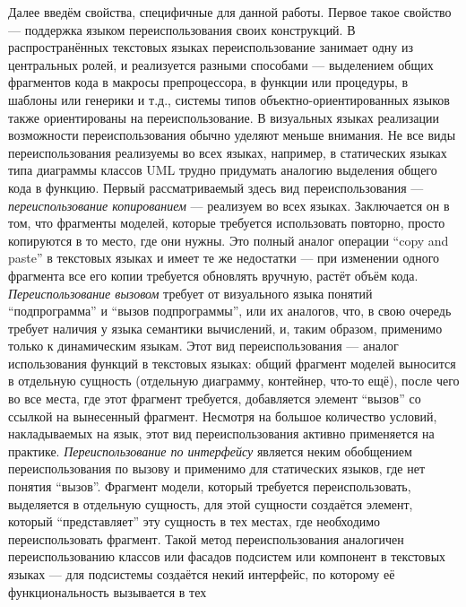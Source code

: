 Далее введём свойства, специфичные для данной работы. Первое такое свойство 
--- поддержка языком переиспользования своих конструкций. В распространённых 
текстовых языках переиспользование занимает одну из центральных ролей, и 
реализуется разными способами --- выделением общих фрагментов кода в макросы 
препроцессора, в функции или процедуры, в шаблоны или генерики и т.д., 
системы типов объектно-ориентированных языков также ориентированы на 
переиспользование. В визуальных языках реализации возможности переиспользования 
обычно уделяют меньше внимания. Не все виды переиспользования реализуемы во всех 
языках, например, в статических языках типа диаграммы классов UML трудно 
придумать аналогию выделения общего кода в функцию. Первый рассматриваемый 
здесь вид переиспользования --- \textit{переиспользование копированием} 
--- реализуем 
во всех языках. Заключается он в том, что фрагменты моделей, которые требуется 
использовать повторно, просто копируются в то место, где они нужны. Это полный 
аналог операции "`copy and paste"' в текстовых языках и имеет те же недостатки 
--- при изменении одного фрагмента все его копии требуется обновлять вручную, 
растёт объём кода. \textit{Переиспользование вызовом} требует от визуального языка 
понятий "`подпрограмма"' и "`вызов подпрограммы"', или их аналогов, что, в свою 
очередь требует наличия у языка семантики вычислений, и, таким образом, 
применимо только к динамическим языкам. Этот вид переиспользования --- аналог 
использования функций в текстовых языках: общий фрагмент моделей выносится в 
отдельную сущность (отдельную диаграмму, контейнер, что-то ещё), после чего во 
все места, где этот фрагмент требуется, добавляется элемент "`вызов"' со 
ссылкой на вынесенный фрагмент. Несмотря на большое количество условий, 
накладываемых на язык, этот вид переиспользования активно применяется на 
практике.
 \textit{Переиспользование по интерфейсу} является неким обобщением 
переиспользования по вызову и применимо для статических языков, где нет понятия 
"`вызов"'. Фрагмент модели, который требуется переиспользовать, выделяется в 
отдельную сущность, для этой сущности создаётся элемент, который 
"`представляет"' эту сущность в тех местах, где необходимо переиспользовать 
фрагмент. Такой метод переиспользования аналогичен переиспользованию классов 
или фасадов подсистем или компонент в текстовых языках --- для подсистемы 
создаётся некий интерфейс, по которому её функциональность вызывается в тех 

